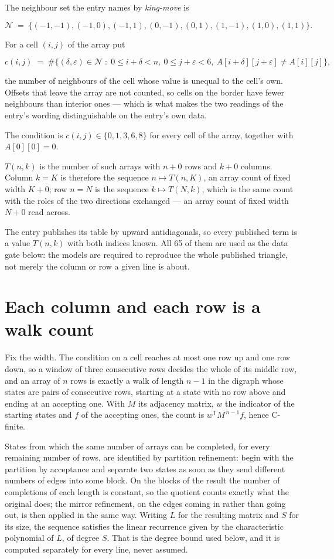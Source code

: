 \documentclass[11pt]{article}
\theoremstyle{definition}
\begin{document}
The neighbour set the entry names by {\itshape king-move} is

\[\mathcal{N} \;=\; \{(-1,-1), (-1,0), (-1,1), (0,-1), (0,1), (1,-1), (1,0), (1,1)\}.\]

For a cell $(i,j)$ of the array put

\[c(i,j) \;=\; \#\bigl\{(\delta,\varepsilon)\in\mathcal{N} \;:\; 0\le i+\delta<n,\ 0\le j+\varepsilon<6,\ A[i+\delta][j+\varepsilon] \neq A[i][j]\bigr\},\]

the number of neighbours of the cell whose value is unequal to the cell's own. Offsets that leave the array are not counted, so cells on the border have fewer neighbours than interior ones --- which is what makes the two readings of the entry's wording distinguishable on the entry's own data.

The condition is $c(i,j) \in \{0, 1, 3, 6, 8\}$ for every cell of the array, together with $A[0][0]=0$.

$T(n,k)$ is the number of such arrays with $n + 0$ rows and $k + 0$ columns. Column $k = K$ is therefore the sequence $n \mapsto T(n,K)$, an array count of fixed width $K + 0$; row $n = N$ is the sequence $k \mapsto T(N,k)$, which is the same count with the roles of the two directions exchanged --- an array count of fixed width $N + 0$ read across.

The entry publishes its table by upward antidiagonals, so every published term is a value $T(n,k)$ with both indices known. All 65 of them are used as the data gate below: the models are required to reproduce the whole published triangle, not merely the column or row a given line is about.

\section{Each column and each row is a walk count}

Fix the width. The condition on a cell reaches at most one row up and one row down, so a window of three consecutive rows decides the whole of its middle row, and an array of $n$ rows is exactly a walk of length $n-1$ in the digraph whose states are pairs of consecutive rows, starting at a state with no row above and ending at an accepting one. With $M$ its adjacency matrix, $w$ the indicator of the starting states and $f$ of the accepting ones, the count is $w^{\mathsf T}M^{\,n-1}f$, hence C-finite.

States from which the same number of arrays can be completed, for every remaining number of rows, are identified by partition refinement: begin with the partition by acceptance and separate two states as soon as they send different numbers of edges into some block. On the blocks of the result the number of completions of each length is constant, so the quotient counts exactly what the original does; the mirror refinement, on the edges coming in rather than going out, is then applied in the same way. Writing $L$ for the resulting matrix and $S$ for its size, the sequence satisfies the linear recurrence given by the characteristic polynomial of $L$, of degree $S$. That is the degree bound used below, and it is computed separately for every line, never assumed.
\end{document}
